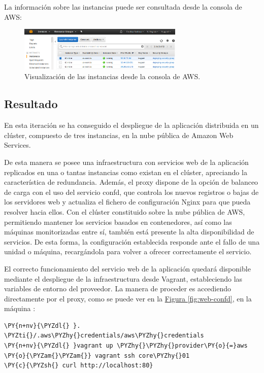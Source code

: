 La información sobre las instancias puede ser consultada desde la consola de AWS:

\begin{figure}[H]
\centering
\includegraphics[width=0.7\textwidth]{images/figures/aws-confd.png}
\caption{Visualización de las instancias desde la consola de AWS.}
\end{figure}

\subsection{Resultado}

En esta iteración se ha conseguido el despliegue de la aplicación distribuida en un clúster, compuesto de tres instancias, en la nube pública de Amazon Web Services.

De esta manera se posee una infraestructura con servicios web de la aplicación replicados en una o tantas instancias como existan en el clúster, apreciando la característica de redundancia. Además, el proxy dispone de la opción de balanceo de carga con el uso del servicio confd, que controla los nuevos registros o bajas de los servidores web y actualiza el fichero de configuración Nginx para que pueda resolver hacia ellos. Con el clúster constituido sobre la nube pública de AWS, permitiendo mantener los servicios basados en contenedores, así como las máquinas monitorizadas entre sí, también está presente la alta disponibilidad de servicios. De esta forma, la configuración establecida responde ante el fallo de una unidad o máquina, recargándola para volver a ofrecer correctamente el servicio.

El correcto funcionamiento del servicio web de la aplicación quedará disponible mediante el despliegue de la infraestructura desde Vagrant, estableciendo las variables de entorno del proveedor. La manera de proceder es accediendo directamente por el proxy, como se puede ver en la \hyperref[fig:web-confd]{Figura \ref{fig:web-confd}}, en la máquina :

\begin{framed_shaded}
\begin{Verbatim}[fontsize=\relsize{-2.5},fontseries=b,commandchars=\\\{\}]
\PY{n+nv}{\PYZdl{} }. \PYZti{}/.aws\PYZhy{}credentials/aws\PYZhy{}credentials
\PY{n+nv}{\PYZdl{} }vagrant up \PYZhy{}\PYZhy{}provider\PY{o}{=}aws \PY{o}{\PYZam{}\PYZam{}} vagrant ssh core\PYZhy{}01
\PY{c}{\PYZsh{} curl http://localhost:80}
\end{Verbatim}
\end{framed_shaded}


